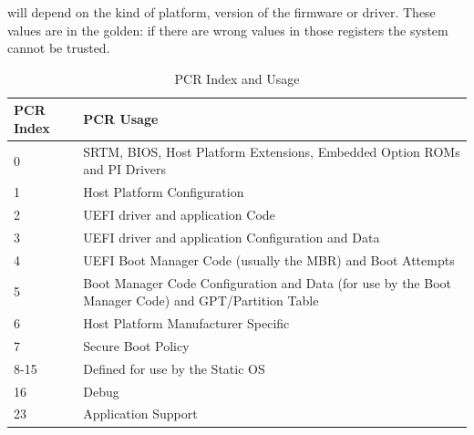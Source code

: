 will depend on the kind of platform, version of the firmware or
driver. These values are in the golden: if there are wrong values in
those registers the system cannot be trusted.
\begin{table}[H]
  \centering
  \begin{tabular}{|p{}|p{}|}
    \hline
    \textbf{PCR Index} & \textbf{PCR Usage} \\ \hline
    0 & SRTM, BIOS, Host Platform Extensions, Embedded Option ROMs and PI Drivers \\ \hline
    1 & Host Platform Configuration \\ \hline
    2 & UEFI driver and application Code \\ \hline
    3 & UEFI driver and application Configuration and Data \\ \hline
    4 & UEFI Boot Manager Code (usually the MBR) and Boot Attempts \\ \hline
    5 & Boot Manager Code Configuration and Data (for use by the Boot Manager Code) and GPT/Partition Table \\ \hline
    6 & Host Platform Manufacturer Specific \\ \hline
    7 & Secure Boot Policy \\ \hline
    8-15 & Defined for use by the Static OS \\ \hline
    16 & Debug \\ \hline
    23 & Application Support \\ \hline
  \end{tabular}
  \caption{PCR Index and Usage}
  \label{table:pcr_usage}
\end{table}

